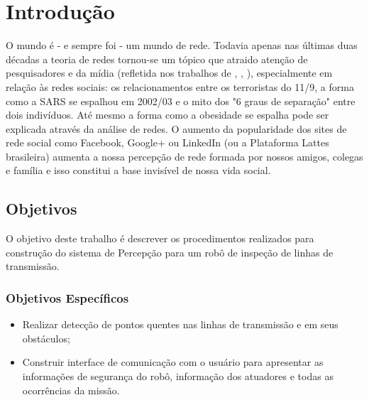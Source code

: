 \chapter{Introdução}
\label{chap:intro}

O mundo \'e - e sempre foi - um mundo de rede. Todavia apenas nas \'ultimas duas d\'ecadas a teoria de redes tornou-se um t\'opico que atraido aten\c{c}\~ao de pesquisadores e da m\'idia (refletida nos trabalhos de \cite{Barabasi2003-1}, \cite{Watts2003}, \cite{NBW2006}), especialmente em rela\c{c}\~ao \`as redes sociais: os relacionamentos entre os terroristas do 11/9, a forma como a SARS se espalhou em 2002/03 e o mito dos "6 graus de separa\c{c}\~ao" entre dois indiv\'iduos. At\'e mesmo a forma como a obesidade se espalha pode ser explicada atrav\'es da an\'alise de redes. O aumento da popularidade dos sites de rede social como Facebook, Google+ ou LinkedIn (ou a Plataforma Lattes brasileira) aumenta a nossa percep\c{c}\~ao de rede formada por nossos amigos, colegas e fam\'ilia e isso constitui a base invis\'ivel de nossa vida social.

\section{Objetivos}
\label{sec:obj}


O objetivo deste trabalho é descrever os procedimentos realizados para construção do sistema de Percepção para um robô de inspeção de linhas de transmissão.  


\subsection{Objetivos Específicos}
\label{ssec:objesp}

\begin{itemize}
\item Realizar detecção de pontos quentes nas linhas de transmissão e em seus obstáculos;
\item Construir interface de comunicação com o usuário para apresentar as informações de segurança do robô, informação dos atuadores e todas as ocorrências da missão.
\end{itemize} 




